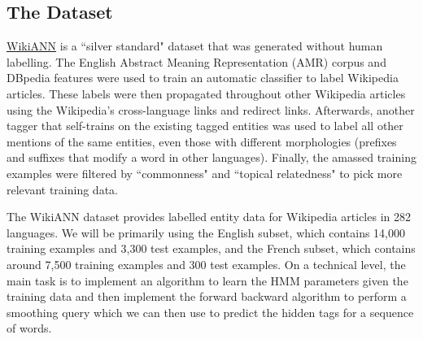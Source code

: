 \documentclass[11pt,addpoints,answers]{exam}
\begin{document}
\subsection{The Dataset}\label{dataset}
\href{https://aclanthology.org/P17-1178.pdf}{WikiANN} is a ``silver standard" dataset that was generated without human labelling. The English Abstract Meaning Representation (AMR) corpus and DBpedia features were used to train an automatic classifier to label Wikipedia articles. These labels were then propagated throughout other Wikipedia articles using the Wikipedia's cross-language links and redirect links. Afterwards, another tagger that self-trains on the existing tagged entities was used to label all other mentions of the same entities, even those with different morphologies (prefixes and suffixes that modify a word in other languages). Finally, the amassed training examples were filtered by ``commonness" and ``topical relatedness" to pick more relevant training data. 

The WikiANN dataset provides labelled entity data for Wikipedia articles in 282 languages. We will be primarily using the English subset, which contains 14,000 training examples and 3,300 test examples, and the French subset, which contains around 7,500 training examples and 300 test examples. On a technical level, the main task is to implement an algorithm to learn the HMM parameters given the training data and then implement the forward backward algorithm to perform a smoothing query which we can then use to predict the hidden tags for a sequence of words. 

\clearpage
\end{document}
